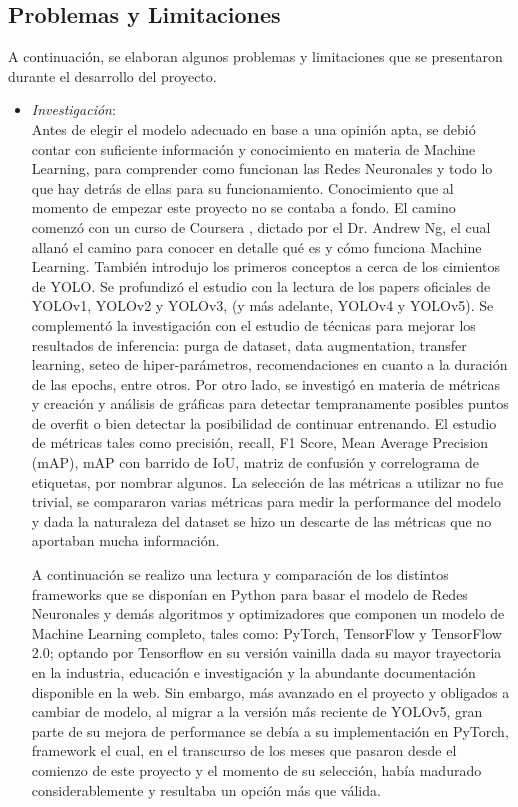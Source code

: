 \subsection{Problemas y Limitaciones}
A continuación, se elaboran algunos problemas y limitaciones que se presentaron durante el desarrollo del proyecto.
\begin{itemize}
        \item \textit{Investigación}: \\
            Antes de elegir el modelo adecuado en base a una opinión apta, se debió contar con suficiente información y conocimiento en materia de Machine Learning, para comprender como funcionan las Redes Neuronales y todo lo que hay detrás de ellas para su funcionamiento. Conocimiento que al momento de empezar este proyecto no se contaba a fondo. El camino comenzó con un curso de Coursera \cite{coursera}, dictado por el Dr. Andrew Ng, el cual allanó el camino para conocer en detalle qué es y cómo funciona Machine Learning. También introdujo los primeros conceptos a cerca de los cimientos de YOLO. Se profundizó el estudio con la lectura de los papers oficiales de YOLOv1, YOLOv2 y YOLOv3, (y más adelante, YOLOv4 y YOLOv5). Se complementó la investigación con el estudio de técnicas para mejorar los resultados de inferencia: purga de dataset, data augmentation, transfer learning, seteo de hiper-parámetros, recomendaciones en cuanto a la duración de las epochs, entre otros. Por otro lado, se investigó en materia de métricas y creación y análisis de gráficas para detectar tempranamente posibles puntos de overfit o bien detectar la posibilidad de continuar entrenando. El estudio de métricas tales como precisión, recall, F1 Score, Mean Average Precision (mAP), mAP con barrido de IoU, matriz de confusión y correlograma de etiquetas, por nombrar algunos. La selección de las métricas a utilizar no fue trivial, se compararon varias métricas para medir la performance del modelo y dada la naturaleza del dataset se hizo un descarte de las métricas que no aportaban mucha información.
            
            A continuación se realizo una lectura y comparación de los distintos frameworks que se disponían en Python para basar el modelo de Redes Neuronales y demás algoritmos y optimizadores que componen un modelo de Machine Learning completo, tales como: PyTorch, TensorFlow y TensorFlow 2.0; optando por Tensorflow en su versión vainilla dada su mayor trayectoria en la industria, educación e investigación y la abundante documentación disponible en la web. Sin embargo, más avanzado en el proyecto y obligados a cambiar de modelo, al migrar a la versión más reciente de YOLOv5, gran parte de su mejora de performance se debía a su implementación en PyTorch, framework el cual, en el transcurso de los meses que pasaron desde el comienzo de este proyecto y el momento de su selección, había madurado considerablemente y resultaba un opción más que válida. \\
        

\end{itemize}
